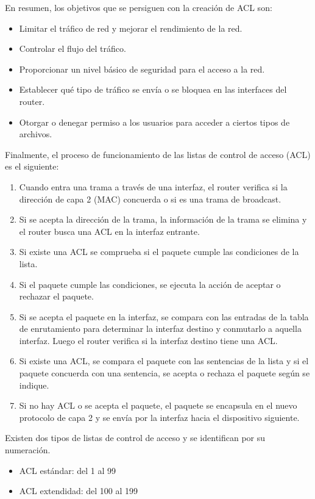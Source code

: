 \documentclass[a4paper,10pt]{article}
\begin{document}
En resumen, los objetivos que se persiguen con la creación de ACL son:
\begin{itemize}
	\item Limitar el tráfico de red y mejorar el rendimiento de la red.
    \item Controlar el flujo del tráfico.
    \item Proporcionar un nivel básico de seguridad para el acceso a la red. 
    \item Establecer qué tipo de tráfico se envía o se bloquea en las interfaces del router. 
    \item Otorgar o denegar permiso a los usuarios para acceder a ciertos tipos de archivos.
\end{itemize}
Finalmente, el proceso de funcionamiento de las listas de control de acceso (ACL) es el siguiente:
\begin{enumerate}
	\item Cuando entra una trama a través de una interfaz, el router verifica si la dirección de capa 2 (MAC) concuerda o si es una trama de broadcast. 
    \item Si se acepta la dirección de la trama, la información de la trama se elimina y el router busca una ACL en la interfaz entrante. 
    \item Si existe una ACL se comprueba si el paquete cumple las condiciones de la lista. 
    \item Si el paquete cumple las condiciones, se ejecuta la acción de aceptar o rechazar el paquete. 
    \item Si se acepta el paquete en la interfaz, se compara con las entradas de la tabla de enrutamiento para determinar la interfaz destino y conmutarlo a aquella interfaz. Luego el router verifica si la interfaz destino tiene una ACL.
    \item Si existe una ACL, se compara el paquete con las sentencias de la lista y si el paquete concuerda con una sentencia, se acepta o rechaza el paquete según se indique. 
    \item Si no hay ACL o se acepta el paquete, el paquete se encapsula en el nuevo protocolo de capa 2 y se envía por la interfaz hacia el dispositivo siguiente.
\end{enumerate}

Existen dos tipos de listas de control de acceso y se identifican por su numeración.

\begin{itemize}
	\item ACL estándar: del 1 al 99
	\item ACL extendidad: del 100 al 199
\end{itemize}
\end{document}
